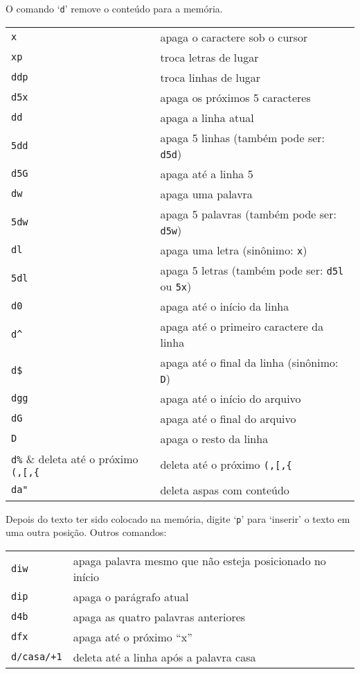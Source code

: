 O comando `{\tt d}' remove o conteúdo para a memória.
\begin{table}[htb]\begin{center} \begin{tabular}{ll} \hline
    \verb|x| & apaga o caractere sob o cursor \\
    \verb|xp| & troca letras de lugar \\
     \verb|ddp| & troca linhas de lugar \\
     \verb|d5x| & apaga os próximos 5 caracteres \\
     \verb|dd| & apaga a linha atual \\
     \verb|5dd| & apaga 5 linhas (também pode ser: \verb|d5d|) \\
     \verb|d5G| & apaga até a linha 5 \\
     \verb|dw|  & apaga uma palavra \\
     \verb|5dw| & apaga 5 palavras (também pode ser: \verb|d5w|) \\
     \verb|dl|  & apaga uma letra (sinônimo: \verb|x|) \\
     \verb|5dl| & apaga 5 letras (também pode ser: \verb|d5l| ou \verb|5x|) \\
     \verb|d0|  & apaga até o início da linha \\
     \verb|d^|  & apaga até o primeiro caractere da linha \\
     \verb|d$|  & apaga até o final da linha (sinônimo: \verb|D|) \\
     \verb|dgg| & apaga até o início do arquivo \\
     \verb|dG|  & apaga até o final do arquivo \\
     \verb|D| & apaga o resto da linha \\
     \verb|d%| & deleta até o próximo \verb|(,[,{| \\
     \verb|da"| & deleta aspas com conteúdo \\
\hline \end{tabular}\end{center}\end{table}

Depois do texto ter sido colocado na memória, digite `{\tt p}' para `inserir' o
texto em uma outra posição. Outros comandos:

\begin{table}[htb]\begin{center} \begin{tabular}{ll} \hline
     \verb|diw| & apaga palavra mesmo que não esteja posicionado no início\\
     \verb|dip| & apaga o parágrafo atual\\
     \verb|d4b| & apaga as quatro palavras anteriores\\
     \verb|dfx| & apaga até o próximo ``x''\\
     \verb|d/casa/+1| & deleta até a linha após a palavra casa\\
\hline \end{tabular}\end{center}\end{table}

